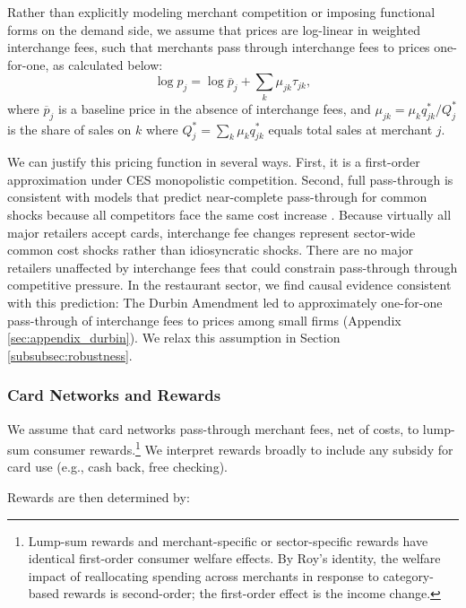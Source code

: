 \documentclass[11pt,english]{article}
\theoremstyle{remark}
\begin{document}
Rather than explicitly modeling merchant competition or imposing functional forms on the demand side, we assume that prices are log-linear in weighted interchange fees, such that merchants pass through interchange fees to prices one-for-one, as calculated below:
\begin{equation}
\log p_{j}=\log\overline{p}_{j}+\sum_{k}\mu_{jk}\tau_{jk},
\end{equation}
where $\overline{p}_j$ is a baseline price in the absence of interchange fees, and $\mu_{jk}=\mu_k q_{jk}^{*}/Q_{j}^{*}$ is the share of sales on $k$ where $Q_{j}^{*}=\sum_{k}\mu_k q_{jk}^{*}$ equals total sales at merchant $j$.

We can justify this pricing function in several ways.
First, it is a first-order approximation under CES monopolistic competition.
Second, full pass-through is consistent with models that predict near-complete pass-through for common shocks because all competitors face the same cost increase \citep{Amiti.etal2019}.
Because virtually all major retailers accept cards, interchange fee changes represent sector-wide common cost shocks rather than idiosyncratic shocks.
There are no major retailers unaffected by interchange fees that could constrain pass-through through competitive pressure.
In the restaurant sector, we find causal evidence consistent with this prediction: The Durbin Amendment led to approximately one-for-one pass-through of interchange fees to prices among small firms (Appendix \ref{sec:appendix_durbin}).
We relax this assumption in Section \ref{subsubsec:robustness}.

\subsubsection{Card Networks and Rewards}
We assume that card networks pass-through merchant fees, net of costs, to lump-sum consumer rewards.\footnote{Lump-sum rewards and merchant-specific or sector-specific rewards have identical first-order consumer welfare effects.
By Roy's identity, the welfare impact of reallocating spending across merchants in response to category-based rewards is second-order; the first-order effect is the income change. } 
We interpret rewards broadly to include any subsidy for card use (e.g., cash back, free checking).

Rewards are then determined by:
\end{document}
